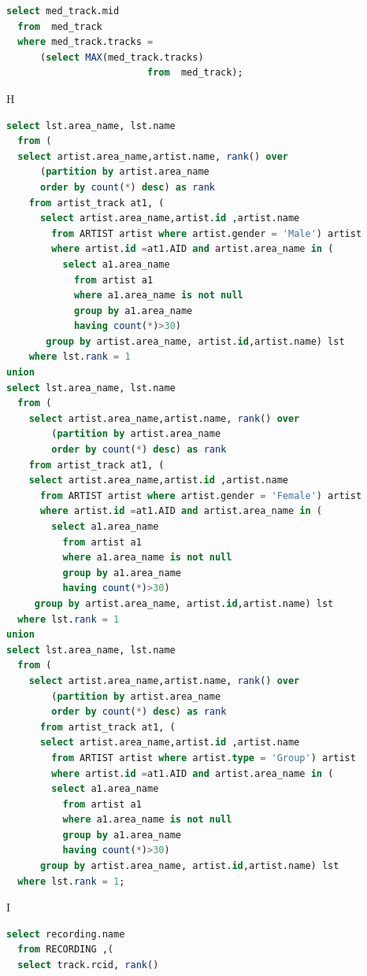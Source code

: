 \documentclass[11pt]{article} %
\begin{document}
{\begin{lstlisting}[language=SQL, keywordstyle=\color{blue!70},
commentstyle=\color{red!50!green!50!blue!50},
rulesepcolor=\color{red!20!green!20!blue!20},
frame=shadowbox]
select med_track.mid
  from  med_track 
  where med_track.tracks =
      (select MAX(med_track.tracks)
                         from  med_track);
\end{lstlisting}
H
\begin{lstlisting}[language=SQL, keywordstyle=\color{blue!70},
commentstyle=\color{red!50!green!50!blue!50},
rulesepcolor=\color{red!20!green!20!blue!20},
frame=shadowbox]
select lst.area_name, lst.name
  from (
  select artist.area_name,artist.name, rank() over
      (partition by artist.area_name
      order by count(*) desc) as rank
    from artist_track at1, (
      select artist.area_name,artist.id ,artist.name
        from ARTIST artist where artist.gender = 'Male') artist
        where artist.id =at1.AID and artist.area_name in (
          select a1.area_name
            from artist a1 
            where a1.area_name is not null
            group by a1.area_name
            having count(*)>30)
       group by artist.area_name, artist.id,artist.name) lst
    where lst.rank = 1
union
select lst.area_name, lst.name
  from (
    select artist.area_name,artist.name, rank() over
        (partition by artist.area_name
        order by count(*) desc) as rank
    from artist_track at1, (
    select artist.area_name,artist.id ,artist.name
      from ARTIST artist where artist.gender = 'Female') artist
      where artist.id =at1.AID and artist.area_name in (
        select a1.area_name
          from artist a1 
          where a1.area_name is not null
          group by a1.area_name
          having count(*)>30)
     group by artist.area_name, artist.id,artist.name) lst
  where lst.rank = 1
union
select lst.area_name, lst.name
  from (
    select artist.area_name,artist.name, rank() over
        (partition by artist.area_name
        order by count(*) desc) as rank
      from artist_track at1, (
      select artist.area_name,artist.id ,artist.name
        from ARTIST artist where artist.type = 'Group') artist
        where artist.id =at1.AID and artist.area_name in (
        select a1.area_name
          from artist a1 
          where a1.area_name is not null
          group by a1.area_name
          having count(*)>30)
      group by artist.area_name, artist.id,artist.name) lst
  where lst.rank = 1;
\end{lstlisting}
I
\begin{lstlisting}[language=SQL, keywordstyle=\color{blue!70},
commentstyle=\color{red!50!green!50!blue!50},
rulesepcolor=\color{red!20!green!20!blue!20},
frame=shadowbox]
select recording.name
  from RECORDING ,(
  select track.rcid, rank()

\end{lstlisting}}
\end{document}
